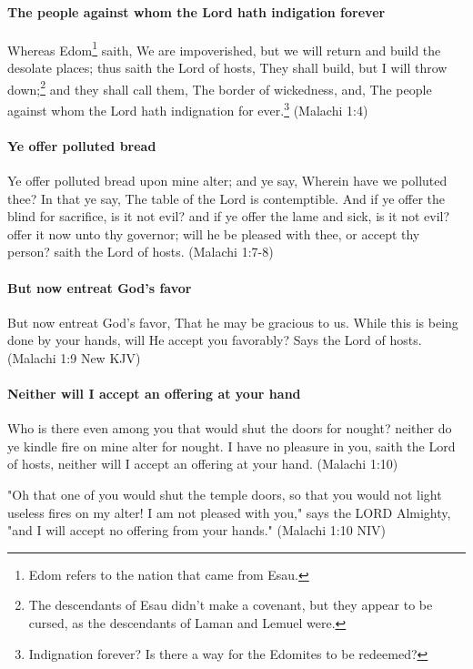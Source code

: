 \paragraph{The people against whom the Lord hath indigation forever}
Whereas Edom\footnote{Edom refers to the nation that came from Esau.} saith, We are impoverished, but we will return and build the desolate places; thus saith the Lord of hosts, They shall build, but I will throw down;\footnote{The descendants of Esau didn't make a covenant, but they appear to be cursed, as the descendants of Laman and Lemuel were.} and they shall call them, The border of wickedness, and, The people against whom the Lord hath indignation for ever.\footnote{Indignation forever? Is there a way for the Edomites to be redeemed?} (Malachi 1:4)

\paragraph{Ye offer polluted bread}
Ye offer polluted bread upon mine alter; and ye say, Wherein have we polluted thee? In that ye say, The table of the Lord is contemptible. And if ye offer the blind for sacrifice, is it not evil? and if ye offer the lame and sick, is it not evil? offer it now unto thy governor; will he be pleased with thee, or accept thy person? saith the Lord of hosts. (Malachi 1:7-8)

\paragraph{But now entreat God's favor}
But now entreat God's favor, That he may be gracious to us. While this is being done by your hands, will He accept you favorably? Says the Lord of hosts. (Malachi 1:9 New KJV)

\paragraph{Neither will I accept an offering at your hand}
Who is there even among you that would shut the doors for nought? neither do ye kindle fire on mine alter for nought. I have no pleasure in you, saith the Lord of hosts, neither will I accept an offering at your hand. (Malachi 1:10)

"Oh that one of you would shut the temple doors, so that you would not light useless fires on my alter! I am not pleased with you," says the LORD Almighty, "and I will accept no offering from your hands." (Malachi 1:10 NIV)

